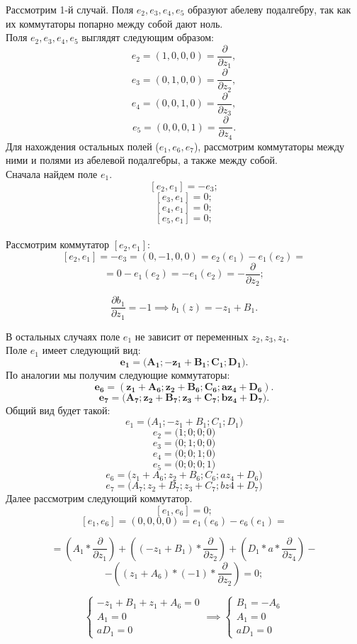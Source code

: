 \href{\href{}{}}{}\documentclass[14pt]{extarticle} %
\begin{document}
Рассмотрим 1-й случай. Поля \( e_2, e_3, e_4, e_5 \) образуют абелеву подалгебру, так как их коммутаторы попарно между собой дают ноль. \\

Поля \( e_2, e_3, e_4, e_5 \) выглядят следующим образом:
\[
e_2 = (1, 0, 0, 0) = \frac{\partial}{\partial z_1},
\]
\[
e_3 = (0, 1, 0, 0) = \frac{\partial}{\partial z_2},
\]
\[
e_4 = (0, 0, 1, 0) = \frac{\partial}{\partial z_3},
\]
\[
e_5 = (0, 0, 0, 1) = \frac{\partial}{\partial z_4}.
\]
Для нахождения остальных полей (\( e_1, e_6, e_7 \)), рассмотрим коммутаторы между ними и полями из абелевой подалгебры, а также между собой. \\

Сначала найдем поле $e_1$.\\
\[
[e_2, e_1] = -e_3;
\]
\[
[e_3, e_1] = 0;
\]
\[
[e_4, e_1] = 0;
\]
\[
[e_5, e_1] = 0;
\]\\
Рассмотрим коммутатор $[e_2, e_1]$:\\
\[
[e_2, e_1] = -e_3 = (0, -1, 0, 0) = e_2(e_1) - e_1(e_2) =
\]
\[
= 0 - e_1(e_2) = - e_1(e_2) = - \frac{\partial }{\partial z_2};
\]

\[
\frac{\partial b_1}{\partial z_1} = -1 \implies b_1(z) = -z_1 + B_1.
\]

В остальных случаях поле $e_1$ не зависит от переменных $z_2, z_3, z_4$.\\
Поле \( e_1 \) имеет следующий вид:
\[
\boldsymbol{e_1 = \big(A_1; -z_1 + B_1; C_1; D_1\big)}.
\]
По аналогии мы получим следующие коммутаторы:
\[
\boldsymbol{e_6 = (z_1 + A_6; z_2 + B_6; C_6; az_4 + D_6)}.
\]
\[
\boldsymbol{e_7 = \big(A_7; z_2 + B_7; z_3 + C_7; bz_4 + D_7\big)}.
\]
Общий вид будет такой:
\[
e_1 = \big( A_1; -z_1 + B_1; C_1; D_1 \big)
\]
\[
e_2 = \big( 1; 0; 0; 0 \big)
\]
\[
e_3 = \big( 0; 1; 0; 0 \big)
\]
\[
e_4 = \big( 0; 0; 1; 0 \big)
\]
\[
e_5 = \big( 0; 0; 0; 1 \big)
\]
\[
e_6 = \big( z_1 + A_6; z_2 + B_6; C_6; az_4 + D_6 \big)
\]
\[
e_7 = \big( A_7; z_2 + B_7; z_3 + C_7; bz4 + D_7 \big)
\]
Далее рассмотрим следующий коммутатор.
\[
[e_1, e_6] = 0;
\]
\[
[e_1, e_6] = (0, 0, 0, 0) = e_1(e_6) - e_6(e_1) =
\]

\[
= \left(A_1 * \frac{\partial}{\partial z_1}\right)
+ \left((-z_1 + B_1) * \frac{\partial}{\partial z_2}\right)
+ \left(D_1 * a * \frac{\partial}{\partial z_4}\right) -
\]
\[
- \left((z_1 + A_6) * (-1) * \frac{\partial}{\partial z_2}\right) = 0;
\]

\[
\begin{cases}
-z_1 + B_1 + z_1 + A_6 = 0 \\
A_1 = 0 \\
aD_1 = 0
\end{cases}
\implies
\begin{cases}
B_1 = -A_6 \\
A_1 = 0 \\
aD_1 = 0
\end{cases}
\]\\
\end{document}
